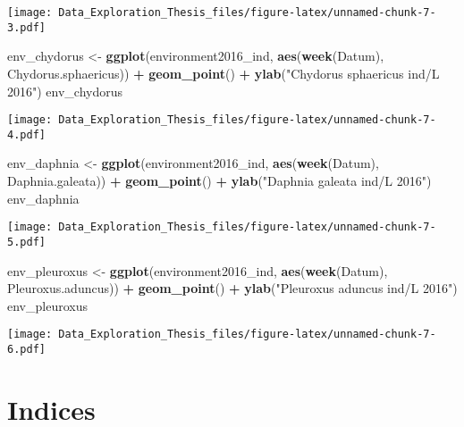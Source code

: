 \documentclass[]{article}
\newenvironment{Shaded}{\begin{snugshade}}{\end{snugshade}}
\newcommand{\KeywordTok}[1]{\textcolor[rgb]{0.13,0.29,0.53}{\textbf{#1}}}
\newcommand{\StringTok}[1]{\textcolor[rgb]{0.31,0.60,0.02}{#1}}
\newcommand{\OperatorTok}[1]{\textcolor[rgb]{0.81,0.36,0.00}{\textbf{#1}}}
\newcommand{\NormalTok}[1]{#1}
\begin{document}
\texttt{[image: Data\_Exploration\_Thesis\_files/figure-latex/unnamed-chunk-7-3.pdf]}

\begin{Shaded}
\begin{Highlighting}[]
\NormalTok{env_chydorus <-}\StringTok{ }\KeywordTok{ggplot}\NormalTok{(environment2016_ind, }\KeywordTok{aes}\NormalTok{(}\KeywordTok{week}\NormalTok{(Datum), Chydorus.sphaericus)) }\OperatorTok{+}
\StringTok{  }\KeywordTok{geom_point}\NormalTok{() }\OperatorTok{+}
\StringTok{  }\KeywordTok{ylab}\NormalTok{(}\StringTok{"Chydorus sphaericus ind/L 2016"}\NormalTok{)}
\NormalTok{env_chydorus}
\end{Highlighting}
\end{Shaded}

\texttt{[image: Data\_Exploration\_Thesis\_files/figure-latex/unnamed-chunk-7-4.pdf]}

\begin{Shaded}
\begin{Highlighting}[]
\NormalTok{env_daphnia <-}\StringTok{ }\KeywordTok{ggplot}\NormalTok{(environment2016_ind, }\KeywordTok{aes}\NormalTok{(}\KeywordTok{week}\NormalTok{(Datum), Daphnia.galeata)) }\OperatorTok{+}
\StringTok{  }\KeywordTok{geom_point}\NormalTok{() }\OperatorTok{+}
\StringTok{  }\KeywordTok{ylab}\NormalTok{(}\StringTok{"Daphnia galeata ind/L 2016"}\NormalTok{)}
\NormalTok{env_daphnia }
\end{Highlighting}
\end{Shaded}

\texttt{[image: Data\_Exploration\_Thesis\_files/figure-latex/unnamed-chunk-7-5.pdf]}

\begin{Shaded}
\begin{Highlighting}[]
\NormalTok{env_pleuroxus <-}\StringTok{ }\KeywordTok{ggplot}\NormalTok{(environment2016_ind, }\KeywordTok{aes}\NormalTok{(}\KeywordTok{week}\NormalTok{(Datum), Pleuroxus.aduncus)) }\OperatorTok{+}
\StringTok{  }\KeywordTok{geom_point}\NormalTok{() }\OperatorTok{+}
\StringTok{  }\KeywordTok{ylab}\NormalTok{(}\StringTok{"Pleuroxus aduncus ind/L 2016"}\NormalTok{)}
\NormalTok{env_pleuroxus}
\end{Highlighting}
\end{Shaded}

\texttt{[image: Data\_Exploration\_Thesis\_files/figure-latex/unnamed-chunk-7-6.pdf]}

\section{Indices}\label{indices}
\end{document}
